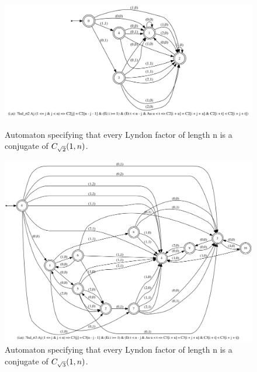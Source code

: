 \begin{figure}[h!]
\vspace{10mm}
	\begin{minipage}{0.45\textwidth}
      \centering
      \includegraphics[width=\linewidth]{sturmian_word_paper/paper_images/root2theorem26.jpg}
      \caption{Automaton specifying that every Lyndon factor of length n is a conjugate of $C_{\sqrt{2}}(1, n)$.}
      \centering

  	\end{minipage}%
    \hspace{0.05\textwidth}
    \begin{minipage}{0.45\textwidth}
      \centering
      \includegraphics[width=\linewidth]{sturmian_word_paper/paper_images/root3theorem26.jpg}
      \caption{Automaton specifying that every Lyndon factor of length n is a conjugate of $C_{\sqrt{3}}(1, n)$.}
      \centering

    \end{minipage}
\end{figure}

